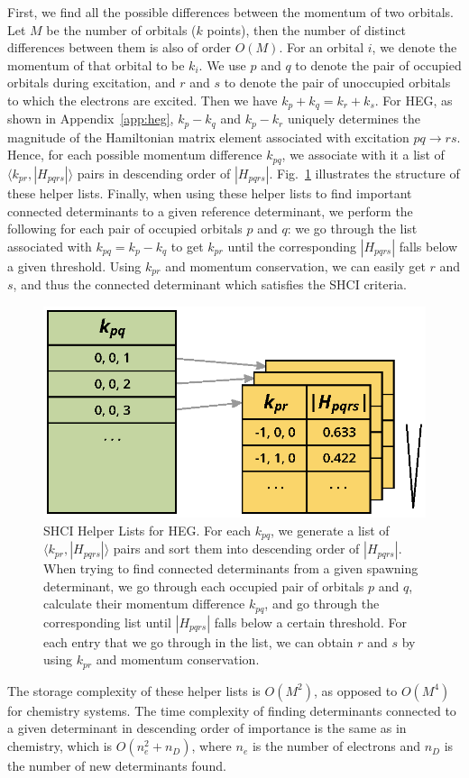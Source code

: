 First, we find all the possible differences between the momentum of two orbitals.
Let $M$ be the number of orbitals ($k$ points), then the number of distinct differences between them is also of order $O(M)$.
For an orbital $i$, we denote the momentum of that orbital to be $k_{i}$.
We use $p$ and $q$ to denote the pair of occupied orbitals during excitation, and $r$ and $s$ to denote the pair of unoccupied orbitals to which the electrons are excited.
Then we have $k_p + k_q = k_r + k_s$.
For HEG, as shown in Appendix~\ref{app:heg}, $k_p - k_q$ and $k_p - k_r$ uniquely determines the magnitude of the Hamiltonian matrix element associated with excitation $pq\to rs$.
Hence, for each possible momentum difference $k_{pq}$, we associate with it a list of $\langle k_{pr}, |H_{pqrs}|\rangle$ pairs in descending order of $|H_{pqrs}|$.
Fig.~\ref{fig:helper} illustrates the structure of these helper lists.
Finally, when using these helper lists to find important connected determinants to a given reference determinant, we perform the following for each pair of occupied orbitals $p$ and $q$: we go through the list associated with $k_{pq} = k_p - k_q$ to get $k_{pr}$ until the corresponding $|H_{pqrs}|$ falls below a given threshold.
Using $k_{pr}$ and momentum conservation, we can easily get $r$ and $s$, and thus the connected determinant which satisfies the SHCI criteria.
\begin{figure}
  \begin{center}
  \includegraphics[width=0.9\linewidth]{figs/HelperList.eps}
  \end{center}
  \vspace{-0.2cm}
  \caption{SHCI Helper Lists for HEG.
  For each $k_{pq}$, we generate a list of $\langle k_{pr}, |H_{pqrs}|\rangle$ pairs and sort them into descending order of $|H_{pqrs}|$.
  When trying to find connected determinants from a given spawning determinant, we go through each occupied pair of orbitals $p$ and $q$, calculate their momentum difference $k_{pq}$, and go through the corresponding list until $|H_{pqrs}|$ falls below a certain threshold.
  For each entry that we go through in the list, we can obtain $r$ and $s$ by using $k_{pr}$ and momentum conservation.
  }
  \label{fig:helper}
\end{figure}

The storage complexity of these helper lists is $O(M^2)$, as opposed to $O(M^4)$ for chemistry systems.
The time complexity of finding determinants connected to a given determinant in descending order of importance is the same as in chemistry, which is $O(n_e^2 + n_D)$, where $n_e$ is the number of electrons and $n_D$ is the number of new determinants found.
